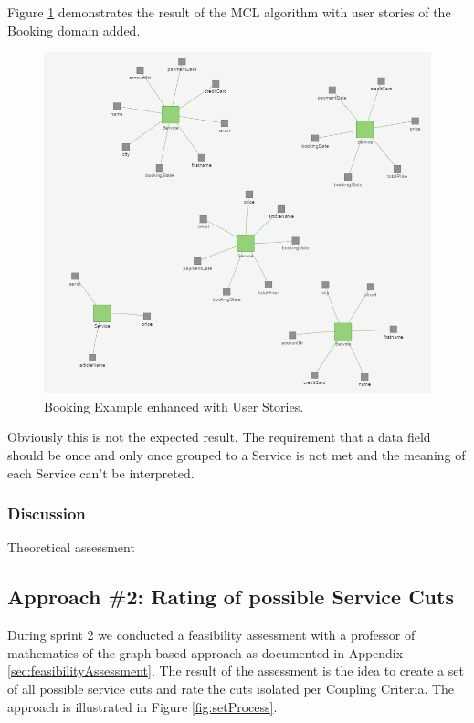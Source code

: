 Figure \ref{fig:clusteringBooking} demonstrates the result of the MCL algorithm with user stories of the Booking domain added. 

\begin{figure}[H]
	\begin{center}
		\includegraphics[scale=0.7]{images/booking_entities_mcl.png}
	\end{center}
	\caption{Booking Example enhanced with User Stories.}
	\label{fig:clusteringBooking}
\end{figure}

Obviously this is not the expected result. The requirement that a data field should be once and only once grouped to a Service is not met and the meaning of each Service can't be interpreted. %


\subsubsection{Discussion}
Theoretical assessment %


\subsection{Approach \#2: Rating of possible Service Cuts}

During sprint 2 we conducted a feasibility assessment with a professor of mathematics of the graph based approach as documented in Appendix \ref{sec:feasibilityAssessment}. The result of the assessment is the idea to create a set of all possible service cuts and rate the cuts isolated per Coupling Criteria. The approach is illustrated in Figure \ref{fig:setProcess}.

